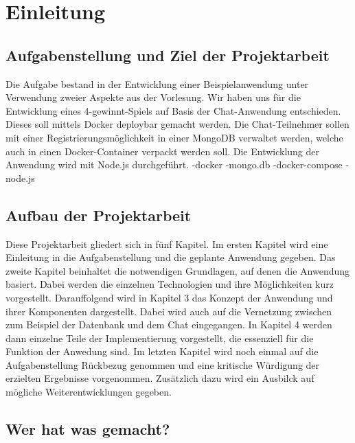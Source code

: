 
\chapter{Einleitung}\label{cha:Einleitung}

\section{Aufgabenstellung und Ziel der Projektarbeit}\label{sec:Aufgabenstellung}
Die Aufgabe bestand in der Entwicklung einer Beispielanwendung unter Verwendung zweier Aspekte aus der Vorlesung. Wir haben uns für die Entwicklung eines 4-gewinnt-Spiels auf Basis der Chat-Anwendung entschieden. Dieses soll mittels Docker deploybar gemacht werden. Die Chat-Teilnehmer sollen mit einer Registrierungsmöglichkeit in einer MongoDB verwaltet werden, welche auch in einen Docker-Container verpackt werden soll. Die Entwicklung der Anwendung wird mit Node.js durchgeführt.
-docker
-mongo.db
-docker-compose
-node.js
\section{Aufbau der Projektarbeit}\label{sec:Aufbau}
Diese Projektarbeit gliedert sich in fünf Kapitel. Im ersten Kapitel wird eine Einleitung in die Aufgabenstellung und die geplante Anwendung gegeben. Das zweite Kapitel beinhaltet die notwendigen Grundlagen, auf denen die Anwendung basiert. Dabei werden die einzelnen Technologien und ihre Möglichkeiten kurz vorgestellt. Darauffolgend wird in Kapitel 3 das Konzept der Anwendung und ihrer Komponenten dargestellt. Dabei wird auch auf die Vernetzung zwischen zum Beispiel der Datenbank und dem Chat eingegangen. In Kapitel 4 werden dann einzelne Teile der Implementierung vorgestellt, die essenziell für die Funktion der Anwedung sind. Im letzten Kapitel wird noch einmal auf die Aufgabenstellung Rückbezug genommen und eine kritische Würdigung der erzielten Ergebnisse vorgenommen. Zusätzlich dazu wird ein Ausbilck auf mögliche Weiterentwicklungen gegeben.
\section{Wer hat was gemacht?}\label{sec:Aufteilung}
